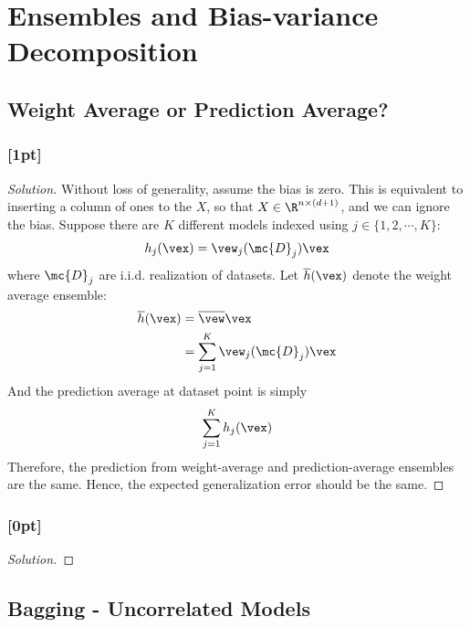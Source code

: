 \documentclass{article}
\begin{document}
	\section{Ensembles and Bias-variance Decomposition}
	\subsection{Weight Average or Prediction Average?}
	\subsubsection{[1pt]}
	\begin{proof}[Solution]
		Without loss of generality, assume the bias is zero. This is equivalent to inserting a column of ones to the $X$, so that $X \in \R^{n \times (d+1)}$, and we can ignore the bias. Suppose there are $K$ different models indexed using $j \in \{1, 2, \cdots, K\}$:
		\begin{align}
			h_j(\vex) = \vew_j(\mc{D}_j)\vex
		\end{align}
		where $\mc{D}_j$ are i.i.d. realization of datasets. Let $\overline{h}(\vex)$ denote the weight average ensemble:
		\begin{align}
			\overline{h}(\vex) &= \overline{\vew} \vex\\
			&= \sum_{j=1}^K \vew_j(\mc{D}_j)\vex
		\end{align}
		And the prediction average at dataset point \vex is simply
		\begin{align}
			\sum_{j=1}^K h_j(\vex)
		\end{align}
		Therefore, the prediction from weight-average and prediction-average ensembles are the same. Hence, the expected generalization error should be the same.
	\end{proof}
	
	\subsubsection{[0pt]}
	\begin{proof}[Solution]
		
	\end{proof}
	
	\subsection{Bagging - Uncorrelated Models}
\end{document}
